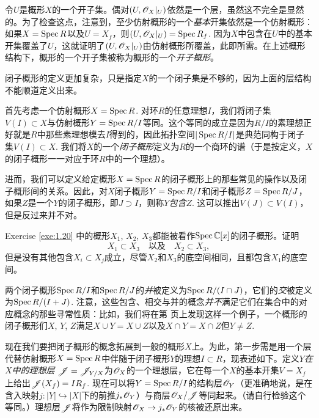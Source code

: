 令$U$是概形$X$的一个开子集。偶对$(U,\mathscr{O}_X|_U)$依然是一个层，虽然这不完全是显然的。为了检查这点，注意到，至少仿射概形的一个\textit{基本}开集依然是一个仿射概形：如果$X=\operatorname{Spec} R$以及$U=X_f$，则$(U,\mathscr{O}_X|_U)=\operatorname{Spec} R_f$. 因为$X$中包含在$U$中的基本开集覆盖了$U$，这就证明了$(U,\mathscr{O}_X|_U)$由仿射概形所覆盖，此即所需。在上述概形结构下，概形的一个开子集被称为概形的一个\textit{开子概形}。

闭子概形的定义更加复杂，只是指定$X$的一个闭子集是不够的，因为上面的层结构不能顺道定义出来。

首先考虑一个仿射概形$X=\operatorname{Spec} R$. 对环$R$的任意理想$I$，我们将闭子集$V(I)\subset X$与仿射概形$Y=\operatorname{Spec} R/I$等同。这个等同的成立是因为$R/I$的素理想正好就是$R$中那些素理想模去$I$得到的，因此拓扑空间$|\operatorname{Spec} R/I|$是典范同构于闭子集$V(I)\subset X$. 我们将$X$的一个\textit{闭子概形}定义为$R$的一个商环的谱（于是按定义，$X$的闭子概形一一对应于环$R$中的一个理想）。

进而，我们可以定义给定概形$X=\operatorname{Spec} R$的闭子概形上的那些常见的操作以及闭子概形间的关系。因此，对$X$闭子概形$Y=\operatorname{Spec} R/I$和闭子概形$Z=\operatorname{Spec} R/J$，如果$Z$是一个$Y$的闭子概形，即$J\supset I$，则称$Y$\textit{包含}$Z$. 这可以推出$V(J)\subset V(I)$，但是反过来并不对。

\begin{exe}\label{exe:1.26}
	Exercise \ref{exe:1.20} 中的概形$X_1$, $X_2$, $X_3$都能被看作$\operatorname{Spec} \mathbb{C}[x]$的闭子概形。证明
	\[
	X_1\subset X_3\quad \text{以及}\quad X_2\subset X_3,
	\]
	但是没有其他包含$X_i\subset X_j$成立，尽管$X_2$和$X_3$的底空间相同，且都包含$X_1$的底空间。
\end{exe}

两个闭子概形$\operatorname{Spec} R/I$和$\operatorname{Spec} R/J$的\textit{并}被定义为$\operatorname{Spec} R/(I\cap J)$，它们的\textit{交}被定义为$\operatorname{Spec} R/(I+J)$. 注意，这些包含、相交与并的概念\textit{并不}满足它们在集合中的对应概念的那些寻常性质：比如，我们将在第 \pageref{p:69} 页上发现这样一个例子，一个概形的闭子概形们$X$, $Y$, $Z$满足$X\cup Y=X\cup Z$以及$X\cap Y=X\cap Z$但$Y\neq Z$.

现在我们要把闭子概形的概念拓展到一般的概形$X$上。为此，第一步需是用一个层代替仿射概形$X=\operatorname{Spec} R$中伴随于闭子概形$Y$的理想$I\subset R$，现表述如下。定义$Y$\textit{在}$X$\textit{中的理想层} $\mathscr{J}=\mathscr{J}_{Y/X}$为$\mathscr{O}_X$的一个理想层，它在每一个$X$的基本开集$V=X_f$上给出$\mathscr{J}(X_f)=I R_f$. 现在可以将$Y=\operatorname{Spec} R/I$的结构层$\mathscr{O}_Y$（更准确地说，是在含入映射$j:|Y|\hookrightarrow |X|$下的前推$j_{*}\mathscr{O}_Y$）与商层$\mathscr{O}_X/\mathscr{J}$等同起来。（请自行检验这个等同。）理想层$\mathscr{J}$将作为限制映射$\mathscr{O}_X\to j_*\mathscr{O}_Y$的核被还原出来。

